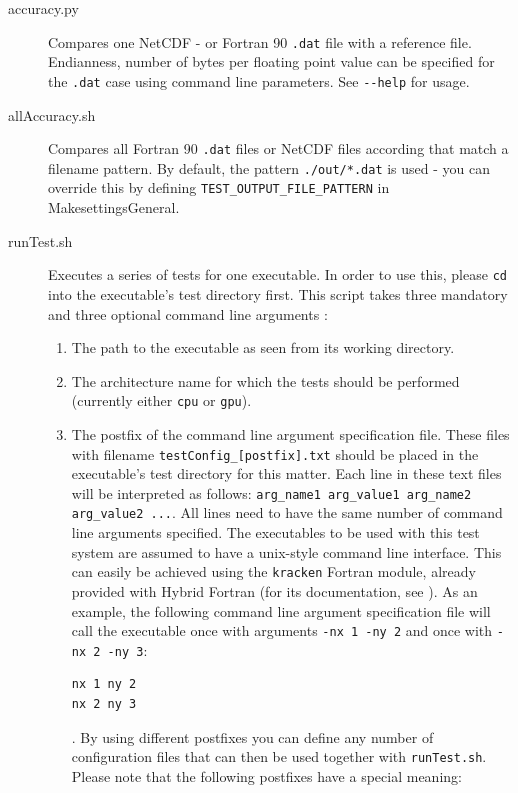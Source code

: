 \begin{description}
 \item [accuracy.py] Compares one NetCDF - or Fortran 90 \verb|.dat| file with a reference file. Endianness, number of bytes per floating point value can be specified for the \verb|.dat| case using command line parameters. See \verb|--help| for usage.
 \item [allAccuracy.sh] Compares all Fortran 90 \verb|.dat| files or NetCDF files according that match a filename pattern. By default, the pattern \verb|./out/*.dat| is used - you can override this by defining \verb|TEST_OUTPUT_FILE_PATTERN| in MakesettingsGeneral.
 \item [runTest.sh] Executes a series of tests for one executable. In order to use this, please \verb|cd| into the executable's test directory first. This script takes three mandatory and three optional command line arguments :
  \begin{enumerate}
   \item The path to the executable as seen from its working directory.
   \item The architecture name for which the tests should be performed (currently either \verb|cpu| or \verb|gpu|).
   \item The postfix of the command line argument specification file. These files with filename \verb|testConfig_[postfix].txt| should be placed in the executable's test directory for this matter. Each line in these text files will be interpreted as follows: \linebreak
   \verb|arg_name1 arg_value1 arg_name2 arg_value2 ...|. All lines need to have the same number of command line arguments specified. The executables to be used with this test system are assumed to have a unix-style command line interface. This can easily be achieved using the \verb|kracken| Fortran module, already provided with Hybrid Fortran (for its documentation, see \cite{Kracken}). As an example, the following command line argument specification file will call the executable once with arguments \verb|-nx 1 -ny 2| and once with \verb|-nx 2 -ny 3|:
\begin{lstlisting}[name=commandLineSpecification, label=listing:commandLineSpecification, caption={A sample command line argument specification file}]
nx 1 ny 2
nx 2 ny 3
\end{lstlisting}. By using different postfixes you can define any number of configuration files that can then be used together with \verb|runTest.sh|. Please note that the following postfixes have a special meaning:

\end{enumerate}
\end{description}
